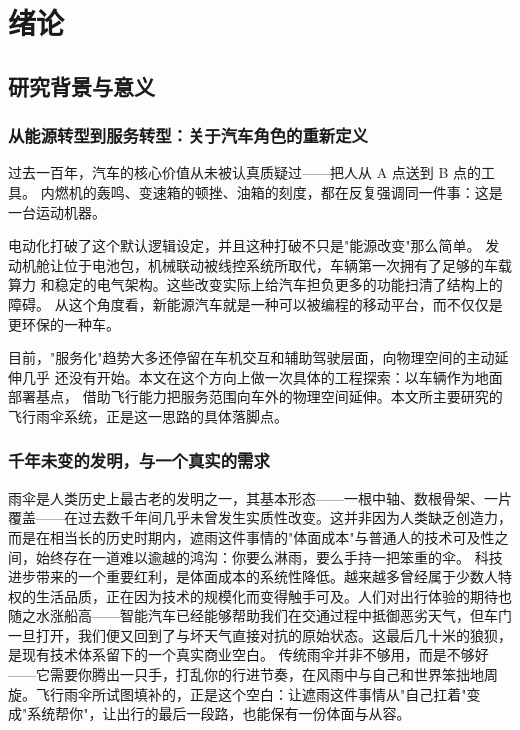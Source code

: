 \chapter{绪论}

\section{研究背景与意义}

\subsection{从能源转型到服务转型：关于汽车角色的重新定义}

过去一百年，汽车的核心价值从未被认真质疑过——把人从 A 点送到 B 点的工具。
内燃机的轰鸣、变速箱的顿挫、油箱的刻度，都在反复强调同一件事：这是一台运动机器。

电动化打破了这个默认逻辑设定，并且这种打破不只是"能源改变"那么简单。
发动机舱让位于电池包，机械联动被线控系统所取代，车辆第一次拥有了足够的车载算力
和稳定的电气架构。这些改变实际上给汽车担负更多的功能扫清了结构上的障碍。
从这个角度看，新能源汽车就是一种可以被编程的移动平台，而不仅仅是更环保的一种车。

目前，"服务化"趋势大多还停留在车机交互和辅助驾驶层面，向物理空间的主动延伸几乎
还没有开始。本文在这个方向上做一次具体的工程探索：以车辆作为地面部署基点，
借助飞行能力把服务范围向车外的物理空间延伸。本文所主要研究的飞行雨伞系统，正是这一思路的具体落脚点。

\subsection{千年未变的发明，与一个真实的需求}

  雨伞是人类历史上最古老的发明之一，其基本形态——一根中轴、数根骨架、一片覆盖——在过去数千年间几乎未曾发生实质性改变。这并非因为人类缺乏创造力，而是在相当长的历史时期内，遮雨这件事情的"体面成本"与普通人的技术可及性之间，始终存在一道难以逾越的鸿沟：你要么淋雨，要么手持一把笨重的伞。
  科技进步带来的一个重要红利，是体面成本的系统性降低。越来越多曾经属于少数人特权的生活品质，正在因为技术的规模化而变得触手可及。人们对出行体验的期待也随之水涨船高——智能汽车已经能够帮助我们在交通过程中抵御恶劣天气，但车门一旦打开，我们便又回到了与坏天气直接对抗的原始状态。这最后几十米的狼狈，是现有技术体系留下的一个真实商业空白。
  传统雨伞并非不够用，而是不够好——它需要你腾出一只手，打乱你的行进节奏，在风雨中与自己和世界笨拙地周旋。飞行雨伞所试图填补的，正是这个空白：让遮雨这件事情从"自己扛着"变成"系统帮你"，让出行的最后一段路，也能保有一份体面与从容。

